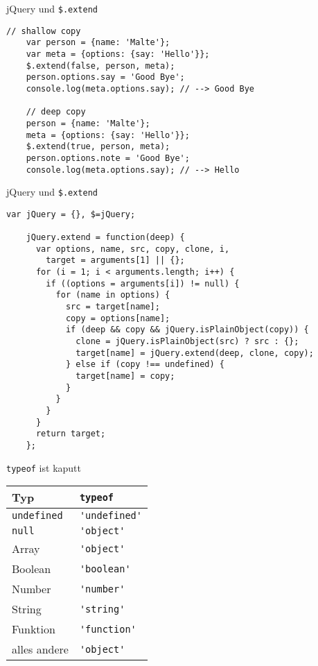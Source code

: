 \begin{frame}[fragile]{jQuery und \texttt{\$.extend}}
  \begin{lstlisting}[gobble=4]
    // shallow copy
    var person = {name: 'Malte'};
    var meta = {options: {say: 'Hello'}};
    $.extend(false, person, meta);
    person.options.say = 'Good Bye';
    console.log(meta.options.say); // --> Good Bye
    
    // deep copy
    person = {name: 'Malte'};
    meta = {options: {say: 'Hello'}};
    $.extend(true, person, meta);
    person.options.note = 'Good Bye';
    console.log(meta.options.say); // --> Hello
  \end{lstlisting}
\end{frame}

\begin{frame}[fragile]{jQuery und \texttt{\$.extend}}
  \begin{lstlisting}[gobble=4]
    var jQuery = {}, $=jQuery;
    
    jQuery.extend = function(deep) {
      var options, name, src, copy, clone, i,
        target = arguments[1] || {};    
      for (i = 1; i < arguments.length; i++) {
        if ((options = arguments[i]) != null) {
          for (name in options) {
            src = target[name];
            copy = options[name];
            if (deep && copy && jQuery.isPlainObject(copy)) {
              clone = jQuery.isPlainObject(src) ? src : {};
              target[name] = jQuery.extend(deep, clone, copy);
            } else if (copy !== undefined) {
              target[name] = copy;
            }
          }
        }
      }
      return target;
    };
  \end{lstlisting}
\end{frame}

\begin{frame}[fragile]{\texttt{typeof} ist kaputt}
  \begin{tabular}{ll}
    Typ & \lstinline-typeof- \\ \hline
    \lstinline-undefined- & \lstinline-'undefined'- \\
    \lstinline-null- & \lstinline-'object'- \\
    Array & \lstinline-'object'- \\
    Boolean & \lstinline-'boolean'- \\
    Number & \lstinline-'number'- \\
    String & \lstinline-'string'- \\
    Funktion & \lstinline-'function'- \\
    alles andere & \lstinline-'object'-
  \end{tabular}
\end{frame}

